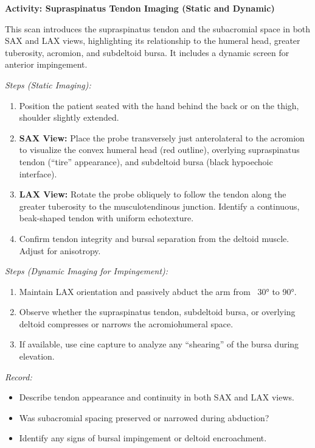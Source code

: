\begin{labactivitybox}
\textbf{Activity: Supraspinatus Tendon Imaging (Static and Dynamic)}

This scan introduces the supraspinatus tendon and the subacromial space in both SAX and LAX views, highlighting its relationship to the humeral head, greater tuberosity, acromion, and subdeltoid bursa. It includes a dynamic screen for anterior impingement.

\textit{Steps (Static Imaging):}
\begin{enumerate}
  \item Position the patient seated with the hand behind the back or on the thigh, shoulder slightly extended.
  \item \textbf{SAX View:} Place the probe transversely just anterolateral to the acromion to visualize the convex humeral head (red outline), overlying supraspinatus tendon (“tire” appearance), and subdeltoid bursa (black hypoechoic interface).
  \item \textbf{LAX View:} Rotate the probe obliquely to follow the tendon along the greater tuberosity to the musculotendinous junction. Identify a continuous, beak-shaped tendon with uniform echotexture. 
  \item Confirm tendon integrity and bursal separation from the deltoid muscle. Adjust for anisotropy.
\end{enumerate}

\textit{Steps (Dynamic Imaging for Impingement):}
\begin{enumerate}
  \item Maintain LAX orientation and passively abduct the arm from ~30° to 90°.
  \item Observe whether the supraspinatus tendon, subdeltoid bursa, or overlying deltoid compresses or narrows the acromiohumeral space.
  \item If available, use cine capture to analyze any “shearing” of the bursa during elevation.
\end{enumerate}

\textit{Record:}
\begin{itemize}
  \item Describe tendon appearance and continuity in both SAX and LAX views.
  \item Was subacromial spacing preserved or narrowed during abduction?
  \item Identify any signs of bursal impingement or deltoid encroachment.
\end{itemize}
\end{labactivitybox}

